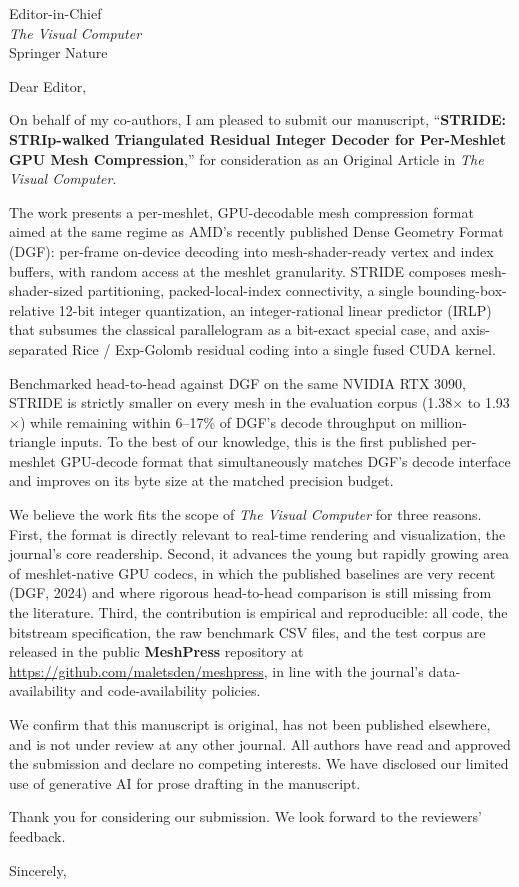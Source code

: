\documentclass[11pt]{letter}
\begin{document}
\begin{letter}{Editor-in-Chief \\ \textit{The Visual Computer} \\ Springer Nature}

\opening{Dear Editor,}

On behalf of my co-authors, I am pleased to submit our manuscript, ``\textbf{STRIDE: STRIp-walked Triangulated Residual Integer Decoder for Per-Meshlet GPU Mesh Compression},'' for consideration as an Original Article in \textit{The Visual Computer}.

The work presents a per-meshlet, GPU-decodable mesh compression format aimed at the same regime as AMD's recently published Dense Geometry Format (DGF): per-frame on-device decoding into mesh-shader-ready vertex and index buffers, with random access at the meshlet granularity. STRIDE composes mesh-shader-sized partitioning, packed-local-index connectivity, a single bounding-box-relative 12-bit integer quantization, an integer-rational linear predictor (IRLP) that subsumes the classical parallelogram as a bit-exact special case, and axis-separated Rice / Exp-Golomb residual coding into a single fused CUDA kernel.

Benchmarked head-to-head against DGF on the same NVIDIA RTX 3090, STRIDE is strictly smaller on every mesh in the evaluation corpus (1.38$\times$ to 1.93$\times$) while remaining within 6--17\% of DGF's decode throughput on million-triangle inputs. To the best of our knowledge, this is the first published per-meshlet GPU-decode format that simultaneously matches DGF's decode interface and improves on its byte size at the matched precision budget.

We believe the work fits the scope of \textit{The Visual Computer} for three reasons. First, the format is directly relevant to real-time rendering and visualization, the journal's core readership. Second, it advances the young but rapidly growing area of meshlet-native GPU codecs, in which the published baselines are very recent (DGF, 2024) and where rigorous head-to-head comparison is still missing from the literature. Third, the contribution is empirical and reproducible: all code, the bitstream specification, the raw benchmark CSV files, and the test corpus are released in the public \textbf{MeshPress} repository at \url{https://github.com/maletsden/meshpress}, in line with the journal's data-availability and code-availability policies.

We confirm that this manuscript is original, has not been published elsewhere, and is not under review at any other journal. All authors have read and approved the submission and declare no competing interests. We have disclosed our limited use of generative AI for prose drafting in the manuscript.

Thank you for considering our submission. We look forward to the reviewers' feedback.

\closing{Sincerely,}

\end{letter}
\end{document}
